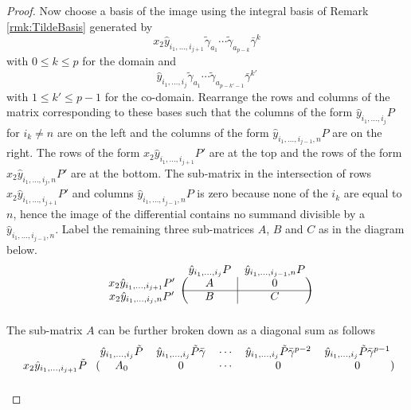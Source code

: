 \documentclass{article}
\theoremstyle{plain}
\theoremstyle{definition}
\numberwithin{thm}{section}
\begin{document}
\begin{proof}
				Now choose a basis of the image using the integral basis of Remark \ref{rmk:TildeBasis} generated by
				\begin{equation*}
					x_2\hat{y}_{i_{1},\dots,i_{j+1}}\tilde{\gamma}_{a_1}\cdots\tilde{\gamma}_{a_{p-k}}\bar{\gamma}^{k}
				\end{equation*}
				with $0\leq k \leq p$ for the domain and
				\begin{equation*}
					\hat{y}_{i_{1},\dots,i_{j}}\tilde{\gamma}_{a_1}\cdots\tilde{\gamma}_{a_{p-k'-1}}\bar{\gamma}^{k'}
				\end{equation*}
				with $1\leq k' \leq p-1$ for the co-domain.
				Rearrange the rows and columns of the matrix corresponding to these bases such that
				the columns of the form $\hat{y}_{i_1,\dots,i_j}P$ for $i_k\neq n$ are on the left
				and the columns of the form $\hat{y}_{i_1,\dots,i_{j-1},n}P$ are on the right.
				The rows of the form $x_2 \hat{y}_{i_1,\dots,i_{j+1}}P'$ are at the top and the rows of the form $x_2 \hat{y}_{i_1,\dots,i_j,n}P'$ are at the bottom.
				The sub-matrix in the intersection of rows $x_2 \hat{y}_{i_1,\dots,i_{j+1}}P'$ and columns $\hat{y}_{i_1,\dots,i_{j-1},n}P$ is zero
				because none of the $i_k$ are equal to $n$, hence the image of the differential contains no summand divisible by a $\hat{y}_{i_1,\dots,i_{j-1},n}$.
				Label the remaining three sub-matrices $A$, $B$ and $C$ as in the diagram below.
				\[
				\begin{blockarray}{ccc}
					 & \hat{y}_{i_1,\dots,i_j}P & \hat{y}_{i_1,\dots,i_{j-1},n}P \\
					\begin{block}{c(c|c)}
						x_2\hat{y}_{i_1,\dots,i_{j+1}}P' & {A} & {0} \\
						\cline{2-3}
						x_2\hat{y}_{i_1,\dots,i_j,n}P' 	 & {B} & {C} \\
					\end{block}
				\end{blockarray}
				\]
				The sub-matrix $A$ can be further broken down as a diagonal sum as follows
				\[
				\begin{blockarray}{cccccc}
					 & \hat{y}_{i_1,\dots,i_j}\tilde{P} & \hat{y}_{i_1,\dots,i_j}\tilde{P}\bar{\gamma} & \cdots & \hat{y}_{i_1,\dots,i_j}\tilde{P}\bar{\gamma}^{p-2} & \hat{y}_{i_1,\dots,i_j}\tilde{P}\bar{\gamma}^{p-1} \\
					\begin{block}{c(ccccc)}
						x_2\hat{y}_{i_1,\dots,i_{j+1}}\tilde{P}						 			 	& {A}_0  & {0}	 & \cdots	& {0}				& {0}	\\

\end{block}
\end{blockarray}\]
\end{proof}
\end{document}
